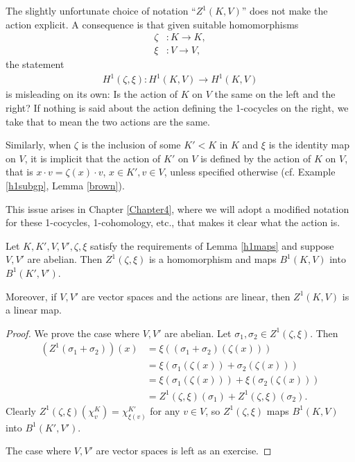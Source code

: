 \begin{remark}
	The slightly unfortunate choice of notation ``$Z^1(K, V)$'' does not make the action explicit. A consequence is that given suitable homomorphisms
	\begin{align*}
		\zeta&:K \rightarrow K, \\
		\xi&: V \rightarrow V,
	\end{align*}
	the statement
	\begin{align*}
		H^1(\zeta, \xi):H^1(K, V) \rightarrow H^1(K, V)
	\end{align*}
	is misleading on its own: Is the action of $K$ on $V$ the same on the left and the right? If nothing is said about the action defining the 1-cocycles on the right, we take that to mean the two actions are the same.

	Similarly, when $\zeta$ is the inclusion of some $K' < K$ in $K$ and $\xi$ is the identity map on $V$, it is implicit that the action of $K'$ on $V$ is defined by the action of $K$ on $V$, that is $x \cdot v = \zeta(x) \cdot v$, $x \in K', v \in V$, unless specified otherwise (cf. Example \ref{h1subgp}, Lemma \ref{brown}).

This issue arises in Chapter \ref{Chapter4}, where we will adopt a modified notation for these 1-cocycles, 1-cohomology, etc., that makes it clear what the action is.
\end{remark}

\begin{lemma} \label{zlinear} Let $K,K',V,V',\zeta,\xi$ satisfy the requirements of Lemma \ref{h1maps} and suppose $V,V'$ are abelian. Then $Z^1(\zeta, \xi)$ is a homomorphism and maps $B^1(K, V)$ into $B^1(K', V')$.

Moreover, if $V, V'$ are vector spaces and the actions are linear, then $Z^1(K, V)$ is a linear map.
\end{lemma}
\begin{proof}
	We prove the case where $V, V'$ are abelian. Let $\sigma_1, \sigma_2 \in Z^1(\zeta, \xi)$. Then
\begin{align*}
	\left(Z^1(\sigma_1 + \sigma_2)\right)(x) &= \xi\left((\sigma_1 + \sigma_2)(\zeta(x))\right) \\
		&= \xi\left(\sigma_1(\zeta(x)) + \sigma_2(\zeta(x))\right) \\
		&= \xi\left(\sigma_1(\zeta(x))\right) + \xi\left(\sigma_2(\zeta(x))\right) \\
		&= Z^1(\zeta, \xi)(\sigma_1) + Z^1(\zeta, \xi)(\sigma_2).
\end{align*}
Clearly $Z^1(\zeta, \xi)\left(\chi^K_v\right) = \chi^{K'}_{\xi(v)}$ for any $v\in V$, so $Z^1(\zeta, \xi)$ maps $B^1(K, V)$ into $B^1(K', V')$.

The case where $V, V'$ are vector spaces is left as an exercise.
\end{proof}

